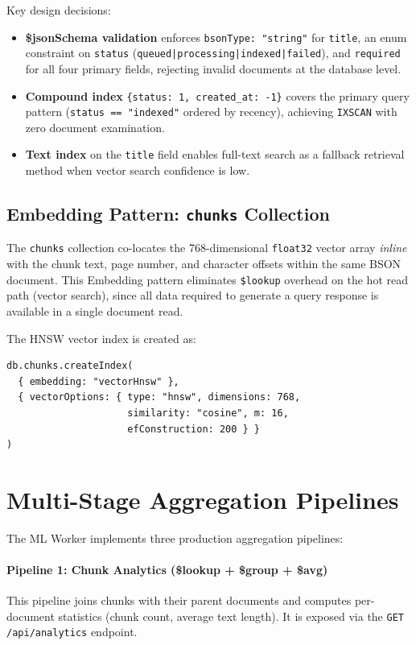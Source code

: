 \documentclass[12pt,a4paper]{report}
\begin{document}
Key design decisions:
\begin{itemize}[leftmargin=1.5cm]
  \item \textbf{\$jsonSchema validation} enforces \texttt{bsonType: "string"}
        for \texttt{title}, an enum constraint on \texttt{status}
        (\texttt{queued|processing|indexed|failed}), and \texttt{required} for
        all four primary fields, rejecting invalid documents at the database level.
  \item \textbf{Compound index} \texttt{\{status: 1, created\_at: -1\}} covers
        the primary query pattern (\texttt{status == "indexed"} ordered by
        recency), achieving \texttt{IXSCAN} with zero document examination.
  \item \textbf{Text index} on the \texttt{title} field enables full-text search
        as a fallback retrieval method when vector search confidence is low.
\end{itemize}

\subsection{Embedding Pattern: \texttt{chunks} Collection}

The \texttt{chunks} collection co-locates the 768-dimensional
\texttt{float32} vector array \emph{inline} with the chunk text, page number,
and character offsets within the same BSON document. This Embedding pattern
eliminates \texttt{\$lookup} overhead on the hot read path (vector search),
since all data required to generate a query response is available in a single
document read.

The HNSW vector index is created as:

\begin{verbatim}
db.chunks.createIndex(
  { embedding: "vectorHnsw" },
  { vectorOptions: { type: "hnsw", dimensions: 768,
                     similarity: "cosine", m: 16,
                     efConstruction: 200 } }
)
\end{verbatim}

\section{Multi-Stage Aggregation Pipelines}

The ML Worker implements three production aggregation pipelines:

\paragraph{Pipeline 1: Chunk Analytics (\$lookup + \$group + \$avg)}
This pipeline joins chunks with their parent documents and computes per-document
statistics (chunk count, average text length). It is exposed via the
\texttt{GET /api/analytics} endpoint.
\end{document}
